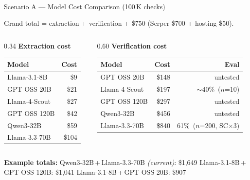 \documentclass[11pt, aspectratio=169]{beamer}
\begin{document}
\begin{frame}{Scenario A — Model Cost Comparison (100\,K checks)}

  Grand total = extraction + verification + \$750 (Serper \$700 + hosting \$50).

  \bigskip
  \begin{columns}[T]
    \begin{column}{0.34\textwidth}
      \textbf{Extraction cost}\\[4pt]
      \renewcommand{\arraystretch}{1.25}
      \begin{tabular}{lr}
        \toprule
        Model & Cost \\
        \midrule
        Llama-3.1-8B  & \$9   \\
        GPT OSS 20B   & \$21  \\
        Llama-4-Scout & \$27  \\
        GPT OSS 120B  & \$42  \\
        Qwen3-32B     & \$59  \\
        Llama-3.3-70B & \$104 \\
        \bottomrule
      \end{tabular}
    \end{column}
    \begin{column}{0.60\textwidth}
      \textbf{Verification cost}\\[4pt]
      \renewcommand{\arraystretch}{1.25}
      \begin{tabular}{lrr}
        \toprule
        Model & Cost & Eval \\
        \midrule
        GPT OSS 20B    & \$148 & untested \\
        Llama-4-Scout  & \$197 & $\sim$40\%\ ($n$=10) \\
        GPT OSS 120B   & \$297 & untested \\
        Qwen3-32B      & \$456 & untested \\
        Llama-3.3-70B  & \$840 & 61\%\ ($n$=200, SC$\times$3) \\
        \bottomrule
      \end{tabular}
    \end{column}
  \end{columns}

  \bigskip
  {\small
  \textbf{Example totals:}
  Qwen3-32B\,+\,Llama-3.3-70B \emph{(current)}: \$1,649 \quad
  Llama-3.1-8B\,+\,GPT OSS 120B: \$1,041 \quad
  Llama-3.1-8B\,+\,GPT OSS 20B: \$907
  }


\end{frame}
\end{document}
